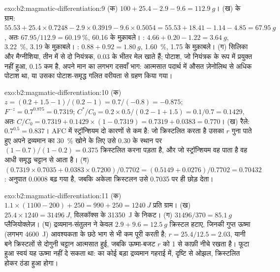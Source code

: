 \begin{solution}{exo:b2:magmatic-differentiation:9}
(क) $100 + 25.4 - 2.9 - 9.6 = \qty{112.9}{g}$। (ख)  के ग्राम: $55.53 +
25.4\times0.7248 - 2.9\times0.3919 - 9.6\times0.5054 = 55.53 + 18.41 - 1.14 - 4.85 =
\qty{67.95}{g}$, अतः $67.95/112.9 = \qty{60.19}{\percent}$, 60.16 के मुक़ाबले। :
$4.66 + 0.20 - 1.22 = \qty{3.64}{g}$, \qty{3.22}{\percent}, 3.19 के मुक़ाबले। :
$0.88 + 0.92 = \qty{1.80}{g}$, \qty{1.60}{\percent}, 1.75 के मुक़ाबले। (ग) सिलिका और मैग्नीशिया, तीन में से दो
नियंत्रक, 0.03 के भीतर मेल खाते हैं; पोटाश, जो नियंत्रक के रूप में प्रयुक्त नहीं हुआ, 0.15 कम है, अपने मान का लगभग
दसवाँ भाग: आत्मसात पदार्थ में औसत ज़ेनोलिथ से अधिक पोटाश था,
या उसका पोटाश-समृद्ध गलित वरीयता से ग्रहण किया गया।
\end{solution}

\begin{solution}{exo:b2:magmatic-differentiation:10}
(क) $z = (0.2 + 1.5 - 1)/(0.2 - 1) = 0.7/(-0.8) = -0.875$; $F^{-z} = 0.7^{0.875} =
0.7319$; $C^*/C_0 = 0.2\times0.5/(0.2 - 1 + 1.5) = 0.1/0.7 = 0.1429$, अतः $C/C_0 =
0.7319 + 0.1429\times(1 - 0.7319) = 0.7319 + 0.0383 = 0.770$। (ख) रैले:
$0.7^{0.5} = 0.837$। AFC  में स्ट्रॉन्शियम दो कारणों से कम है: जो क्रिस्टलित करता है उसका $r$ गुना पाते हुए अपने द्रव्यमान का
\qty{30}{\percent} खोने के लिए
उसे 0.30 के स्थान पर $(1 - 0.7)/(1 - 0.2) = 0.375$ क्रिस्टलित करना पड़ता है, और जो स्ट्रॉन्शियम वह पाता है
वह आधी समृद्ध चट्टान से आता है। (ग) $(0.7319\times0.7035 + 0.0383\times0.7200)/0.7702
= (0.5149 + 0.0276)/0.7702 = 0.70432$: अनुपात 0.0008 बढ़ गया है, जबकि
अकेला क्रिस्टलन उसे 0.7035 पर ही छोड़ देता।
\end{solution}

\begin{solution}{exo:b2:magmatic-differentiation:11}
(क) $1.1\times(1100 - 200) + 250 = 990 + 250 = \qty{1240}{J}$ प्रति ग्राम। (ख)
$25.4\times1240 = \qty{31496}{J}$, विलकॉक्स के \qty{31350}{J} के निकट। (ग)
$31496/370 = \qty{85.1}{g}$ प्लैजियोक्लेज़। (घ) द्रव्यमान-संतुलन ने केवल $2.9 +
9.6 = \qty{12.5}{g}$ क्रिस्टल हटाए, जिनकी गुप्त ऊष्मा (लगभग \qty{4600}{J}) आवश्यकता के
छठे भाग से भी कम पूरी करती है; $r = 25.4/12.5 = 2.03$, यानी बने क्रिस्टलों से दोगुनी चट्टान आत्मसात हुई,
जबकि ऊष्मा-बजट $r$ को 1 से काफ़ी नीचे रखता है। फूटा हुआ
 स्वयं यह ऊष्मा नहीं दे सकता था:  का कोई बड़ा द्रव्यमान गहराई में,
दृष्टि से ओझल, क्रिस्टलित होकर ठंडा हुआ होगा।
\end{solution}

